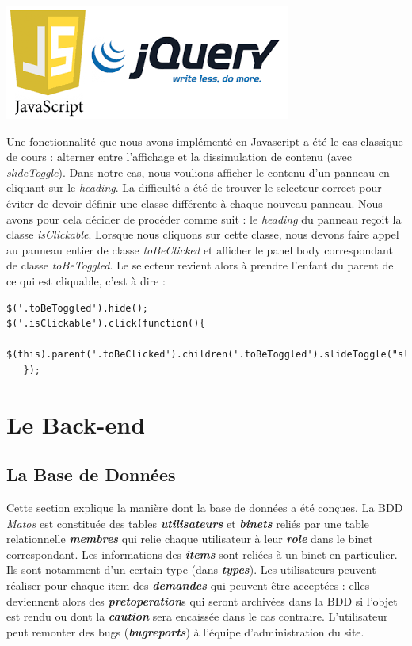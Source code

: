 \documentclass[titlepage,11pt,a4paper]{article}
\begin{document}
\begin{center}
\includegraphics[scale=0.25]{js-jquery.png}
\end{center}

Une fonctionnalité que nous avons implémenté en Javascript a été le cas classique de cours : alterner entre l'affichage et la dissimulation de contenu (avec \emph{slideToggle}). Dans notre cas, nous voulions afficher le contenu d'un panneau en cliquant sur le \emph{heading}. La difficulté a été de trouver le selecteur correct pour éviter de devoir définir une classe différente à chaque nouveau panneau. Nous avons pour cela décider de procéder comme suit : le \emph{heading} du panneau reçoit la classe \emph{isClickable}. Lorsque nous cliquons sur cette classe, nous devons faire appel au panneau entier de classe \emph{toBeClicked} et afficher le panel body correspondant de classe \emph{toBeToggled}. Le selecteur revient alors à prendre l'enfant du parent de ce qui est cliquable, c'est à dire : 

\begin{lstlisting}[title=Affichage des éléments dans un panneau]
$('.toBeToggled').hide();
$('.isClickable').click(function(){
   $(this).parent('.toBeClicked').children('.toBeToggled').slideToggle("slow");
   });
\end{lstlisting}


\section{Le Back-end}

\subsection{La Base de Données}

Cette section explique la manière dont la base de données a été conçues. La BDD \emph{Matos} est constituée des tables \textbf{\emph{utilisateurs}} et \textbf{\emph{binets}} reliés par une table relationnelle \textbf{\emph{membres}} qui relie chaque utilisateur à leur \textbf{\emph{role}} dans le binet correspondant. Les informations des \textbf{\emph{items}} sont reliées à un binet en particulier. Ils sont notamment d'un certain type (dans \textbf{\emph{types}}). Les utilisateurs peuvent réaliser pour chaque item des \textbf{\emph{demandes}} qui peuvent être acceptées : elles deviennent alors des \textbf{\emph{pretoperation}}s qui seront archivées dans la BDD si l'objet est rendu ou dont la \textbf{\emph{caution}} sera encaissée dans le cas contraire. L'utilisateur peut remonter des bugs (\textbf{\emph{bugreports}}) à l'équipe d'administration du site.\\
\end{document}
